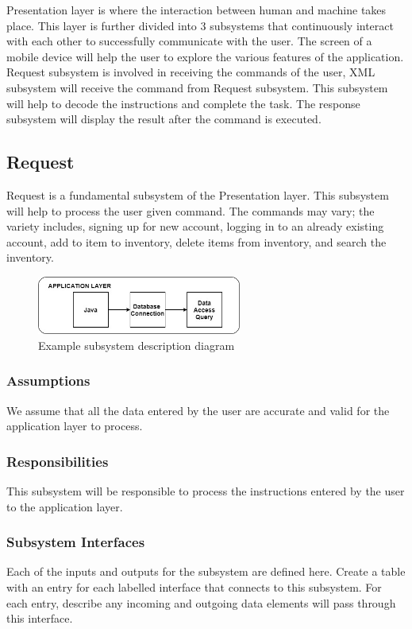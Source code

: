 Presentation layer is where the interaction between human and machine takes place. This layer is further divided 
into 3 subsystems that continuously interact with each other to successfully communicate with the user. The screen 
of a mobile device will help the user to explore the various features of the application. Request subsystem is 
involved in receiving the commands of the user, XML subsystem will receive the command from Request subsystem. 
This subsystem will help to decode the instructions and complete the task. The response subsystem will display 
the result after the command is executed.

\subsection{Request}
Request is a fundamental subsystem of the Presentation layer. This subsystem will help to process the user given
 command. The commands may vary; the variety includes, signing up for new account, logging in to an already 
 existing account, add to item to inventory, delete items from inventory, and search the inventory.

\begin{figure}[h!]
	\centering
 	\includegraphics[width=0.60\textwidth]{images/App.jpg}
 \caption{Example subsystem description diagram}
\end{figure}

\subsubsection{Assumptions}
We assume that all the data entered by the user are accurate and valid for the application layer to process.

\subsubsection{Responsibilities}
This subsystem will be responsible to process the instructions entered by the user to the application layer. 

\subsubsection{Subsystem Interfaces}
Each of the inputs and outputs for the subsystem are defined here. Create a table with an entry for each labelled 
interface that connects to this subsystem. For each entry, describe any incoming and outgoing data elements will
 pass through this interface.

